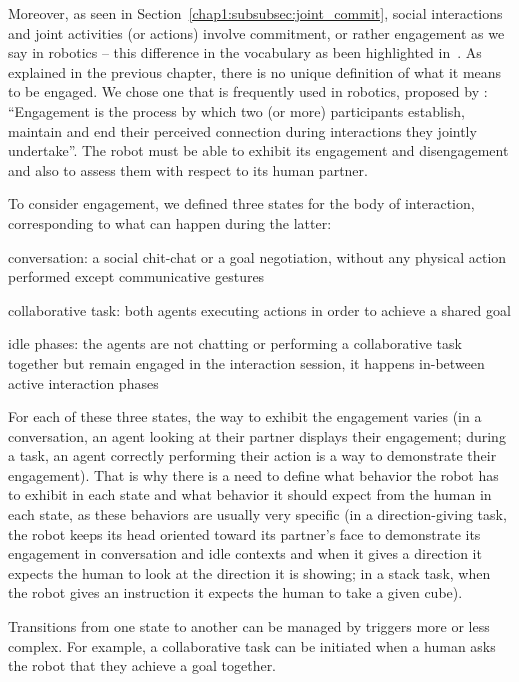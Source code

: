 \documentclass[a4paper,11pt,twoside]{StyleThese}
\begin{document}
Moreover, as seen in Section~\ref{chap1:subsubsec:joint_commit}, social interactions and joint activities (or actions) involve commitment, or rather engagement as we say in robotics -- this difference in the vocabulary as been highlighted in~\citep{castro_2019_commitments}. As explained in the previous chapter, there is no unique definition of what it means to be engaged. We chose one that is frequently used in robotics, proposed by \cite{sidner_2003_engagement}: ``Engagement is the process by which two (or more) participants establish, maintain and end their perceived connection during interactions they jointly undertake''. The robot must be able to exhibit its engagement and disengagement and also to assess them with respect to its human partner.

To consider engagement, we defined three states for the body of interaction, corresponding to what can happen during the latter: 
\begin{bulletList}
	\item conversation: a social chit-chat or a goal negotiation, without any physical action performed except communicative gestures
	\item collaborative task: both agents executing actions in order to achieve a shared goal
	\item idle phases: the agents are not chatting or performing a collaborative task together but remain engaged in the interaction session, it happens in-between active interaction phases
\end{bulletList}

For each of these three states, the way to exhibit the engagement varies (\eg in a conversation, an agent looking at their partner displays their engagement; during a task, an agent correctly performing their action is a way to demonstrate their engagement). That is why there is a need to define what behavior the robot has to exhibit in each state and what behavior it should expect from the human in each state, as these behaviors are usually very specific (\eg in a direction-giving task, the robot keeps its head oriented toward its partner's face to demonstrate its engagement in conversation and idle contexts and when it gives a direction it expects the human to look at the direction it is showing; in a stack task, when the robot gives an instruction it expects the human to take a given cube).

Transitions from one state to another can be managed by triggers more or less complex. For example, a collaborative task can be initiated when a human asks the robot that they achieve a goal together.
\end{document}
